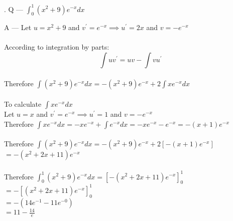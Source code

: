\documentclass{article}
\newcounter{question}
\begin{document}
\newcommand\Que[1]{%
   \leavevmode\par
   \stepcounter{question}
   \noindent
   \thequestion. Q --- #1\par}

\newcommand\Ans[2][]{%
    \leavevmode\par\noindent
   {A --- \textbf{#1}#2\par}}

\Que{ $ \int_{0}^{1}{(x^2+9)e^{-x}} dx $ }
\Ans
{
Let $ u = x^2+9 $ and $ v^{\prime} = e^{-x} 
\implies u^{\prime} = 2x $ and $ v = -e^{-x} $\\\\

According to integration by parts:\\
$$\int{uv^{\prime}}=uv-\int{vu^{\prime}}$$\\

Therefore $ \int{(x^2+9)e^{-x}} dx 
= -(x^2+9)e^{-x} + 2 \int{ xe^{-x} } dx $\\\\

To calculate $ \int{ xe^{-x} } dx $\\

Let $ u = x $ and $ v^{\prime} = e^{-x} 
\implies u^{\prime} = 1 $ and $ v = -e^{-x} $\\

Therefore $ \int{ xe^{-x} } dx 
= -xe^{-x} + \int{e^{-x}} dx
= -xe^{-x} - e^{-x}
= -(x+1)e^{-x} $\\\\

Therefore $ \int{(x^2+9)e^{-x}} dx 
= -(x^2+9)e^{-x} + 2[-(x+1)e^{-x}] $\\

$ = -(x^2+2x+11)e^{-x} $\\\\

Therefore $ \int_{0}^{1}{(x^2+9)e^{-x}} dx 
= \left[ -(x^2+2x+11)e^{-x} \right]_{0}^{1} $\\

$ = -\left[ (x^2+2x+11)e^{-x} \right]_{0}^{1} $\\

$ = -(14e^{-1} - 11e^{-0}) $\\

$ = 11 - \frac{14}{e} $\\

}
\end{document}
